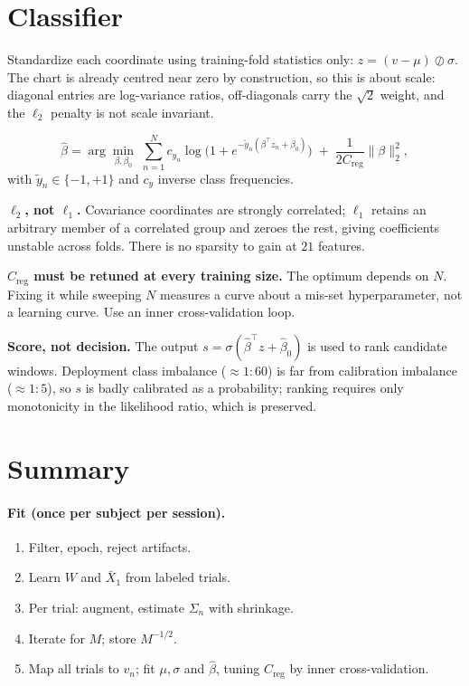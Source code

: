 \documentclass[11pt]{article}
\begin{document}
\section{Classifier}

Standardize each coordinate using training-fold statistics only:
$z = (v - \mu) \oslash \sigma$. The chart is already centred near zero
by construction, so this is about scale: diagonal entries are
log-variance ratios, off-diagonals carry the $\sqrt{2}$ weight, and the
$\ell_2$ penalty is not scale invariant.

\[
\hat\beta = \arg\min_{\beta,\beta_0}
\; \sum_{n=1}^{N} c_{y_n} \log\!\Big(1 + e^{-\tilde{y}_n(\beta^\top z_n + \beta_0)}\Big)
\;+\; \frac{1}{2C_{\mathrm{reg}}}\|\beta\|_2^2 ,
\]
with $\tilde{y}_n \in \{-1,+1\}$ and $c_{y}$ inverse class frequencies.

\textbf{$\ell_2$, not $\ell_1$.} Covariance coordinates are strongly
correlated; $\ell_1$ retains an arbitrary member of a correlated group
and zeroes the rest, giving coefficients unstable across folds. There
is no sparsity to gain at $21$ features.

\textbf{$C_{\mathrm{reg}}$ must be retuned at every training size.} The
optimum depends on $N$. Fixing it while sweeping $N$ measures a curve
about a mis-set hyperparameter, not a learning curve. Use an inner
cross-validation loop.

\textbf{Score, not decision.} The output
$s = \sigma(\hat\beta^\top z + \hat\beta_0)$ is used to rank candidate
windows. Deployment class imbalance ($\approx 1{:}60$) is far from
calibration imbalance ($\approx 1{:}5$), so $s$ is badly calibrated as
a probability; ranking requires only monotonicity in the likelihood
ratio, which is preserved.

\section{Summary}

\paragraph{Fit (once per subject per session).}
\begin{enumerate}[label=\arabic*.,leftmargin=*,itemsep=1pt]
\item Filter, epoch, reject artifacts.
\item Learn $W$ and $\bar{X}_1$ from labeled trials.
\item Per trial: augment, estimate $\Sigma_n$ with shrinkage.
\item Iterate for $M$; store $M^{-1/2}$.
\item Map all trials to $v_n$; fit $\mu,\sigma$ and $\hat\beta$,
      tuning $C_{\mathrm{reg}}$ by inner cross-validation.
\end{enumerate}
\end{document}
